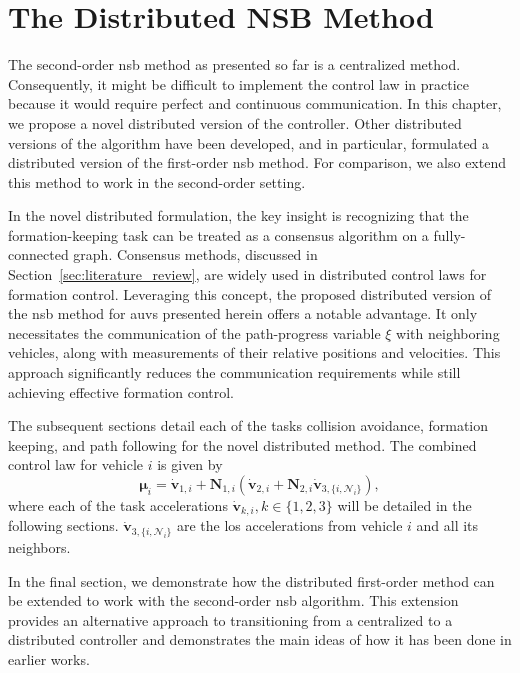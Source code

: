 \chapter{The Distributed NSB Method}\label{cha:distributed_NSB}
The second-order \gls{nsb} method as presented so far is a centralized method. Consequently, it might be difficult to implement the control law in practice because it would require perfect and continuous communication. In this chapter, we propose a novel distributed version of the controller. Other distributed versions of the algorithm have been developed, and in particular, \cite{matous_formation_2023} formulated a distributed version of the first-order \gls{nsb} method. For comparison, we also extend this method to work in the second-order setting.

In the novel distributed formulation, the key insight is recognizing that the formation-keeping task can be treated as a consensus algorithm on a fully-connected graph. Consensus methods, discussed in Section~\ref{sec:literature_review}, are widely used in distributed control laws for formation control. Leveraging this concept, the proposed distributed version of the \gls{nsb} method for \glspl{auv} presented  herein offers a notable advantage. It only necessitates the communication of the path-progress variable $\xi$ with neighboring vehicles, along with measurements of their relative positions and velocities. This approach significantly reduces the communication requirements while still achieving effective formation control.

The subsequent sections detail each of the tasks collision avoidance, formation keeping, and path following for the novel distributed method. The combined control law for vehicle $i$ is given by 
\begin{equation}\label{eq:distributed_NSB_controller}
    \bm{\mu}_i = \dot{\mathbf{v}}_{1,i} + \mathbf{N}_{1,i}(\dot{\mathbf{v}}_{2,i}+\mathbf{N}_{2,i}\dot{\mathbf{v}}_{3,\{i, \mathcal{N}_i\}}),
\end{equation}
where each of the task accelerations $\dot{\mathbf{v}}_{k,i}, k\in \{1,2,3\}$ will be detailed in the following sections. $\dot{\mathbf{v}}_{3,\{i, \mathcal{N}_i\}}$ are the \gls{los} accelerations from vehicle $i$ and all its neighbors.

In the final section, we demonstrate how the distributed first-order method can be extended to work with the second-order \gls{nsb} algorithm. This extension provides an alternative approach to transitioning from a centralized to a distributed controller and demonstrates the main ideas of how it has been done in earlier works.

